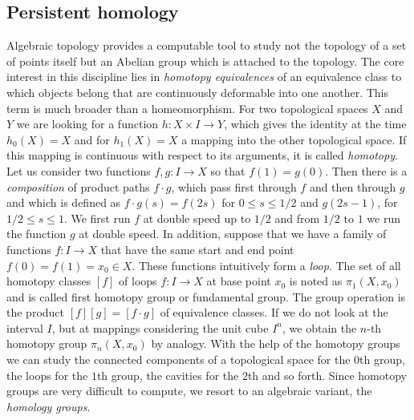 \documentclass[runningheads,orivec]{llncs}
\begin{document}
\subsection{Persistent homology}
Algebraic topology provides a computable tool to study not the topology of a set of points itself but an Abelian group which is attached to the topology. The core interest in this discipline lies in \emph{homotopy equivalences} of an equivalence class to which objects belong that are continuously deformable into one another. This term is much broader than a homeomorphism. For two topological spaces $X$ and $Y$ we are looking for a function $h: X \times I \rightarrow Y$, which gives the identity at the time $h_0(X) = X$ and for $h_1(X) = X$ a mapping into the other topological space. If this mapping is continuous with respect to its arguments, it is called \emph{homotopy}. Let us consider two functions $f,g: I \rightarrow X$ so that $f(1) = g(0)$. Then there is a \emph{composition} of product paths $f \cdot g$, which pass first through $f$ and then through $g$ and which is defined as $f \cdot g (s) = f(2s)$ for $0 \leq s \leq 1/2$ and $g(2s - 1)$, for $1/2 \leq s \leq 1$. We first run $f$ at double speed up to $1/2$ and from $1/2$ to $1$ we run the function $g$ at double speed. In addition, suppose that we have a family of functions $f: I \rightarrow X$ that have the same start and end point $f(0) = f(1) = x_0 \in X$. These functions intuitively form a \emph{loop}. The set of all homotopy classes $[f]$ of loops $f: I \rightarrow X$ at base point $x_0$ is noted as $\pi_1(X,x_0)$ and is called first homotopy group or fundamental group. The group operation is the product $[f][g] = [f \cdot g]$ of equivalence classes. If we do not look at the interval $I$, but at mappings considering the unit cube $I^n$, we obtain the $n$-th homotopy group $\pi_n(X,x_0)$ by analogy. With the help of the homotopy groups we can study the connected components of a topological space for the $0$th group, the loops for the $1$th group, the cavities for the $2$th and so forth. Since homotopy groups are very difficult to compute, we resort to an algebraic variant, the \emph{homology groups}.
\end{document}
